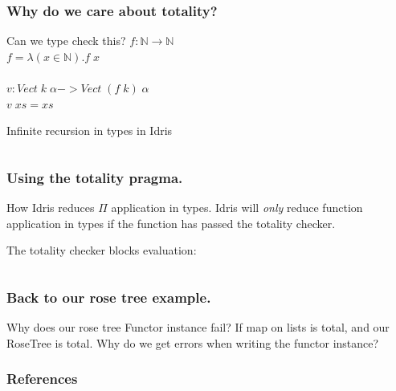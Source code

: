 \documentclass
  [hyperref={colorlinks = true,linkcolor = blue, 
             citecolor = blue, urlcolor = blue}
  ]{beamer}
\begin{document}
\begin{frame}[fragile]
\frametitle{Why do we care about totality?}
\begin{block}{Can we type check this?}
$f : \mathbb{N} \rightarrow \mathbb{N}$ \\
$f = \lambda(x \in \mathbb{N}).f\;x$ \\
$\;$\\
$v : Vect\;k\;\alpha -> Vect\; (f\;k)\;\alpha$ \\
$v\;xs = xs$
\end{block}

\begin{block}{Infinite recursion in types in Idris}
  \inputminted{idris}{../Code/src/ForeverExample.idr}
\end{block}
\end{frame}

\begin{frame}[fragile]
\frametitle{Using the totality pragma.}

\begin{block}{How Idris reduces $\Pi$ application in types.}
Idris will \textit{only} reduce function application in types
if the function has passed the totality checker.
\end{block}

\begin{block}{The totality checker blocks evaluation:}
  \inputminted{idris}{../Code/src/ForeverExampleFail.idr}
\end{block}
\end{frame}

\begin{frame}[fragile]
\frametitle{Back to our rose tree example.}
\begin{block}{Why does our rose tree Functor instance fail?}
If map on lists is total, and our RoseTree is total. Why do we get
errors when writing the functor instance?
\end{block}

\end{frame}


\begin{frame}[fragile]
\frametitle{References}
{}
\end{frame}
\end{document}
